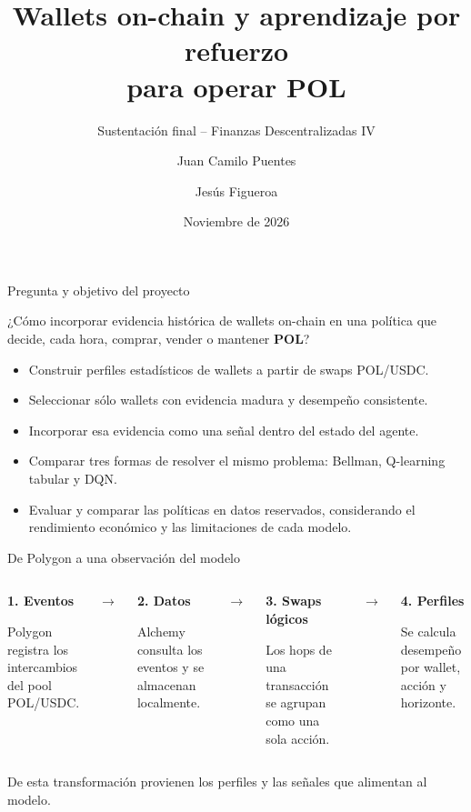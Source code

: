 \documentclass[10pt,aspectratio=169]{beamer}
\title[Wallets, Bellman, Q-learning y DQN]{Wallets on-chain y aprendizaje por refuerzo\\para operar POL}
\subtitle{Sustentación final -- Finanzas Descentralizadas IV}
\author{Juan Camilo Puentes \and Jesús Figueroa}
\institute{Profesor: Julián Sánchez}
\date{Noviembre de 2026}
\newcommand{\POL}{\textbf{POL}}
\begin{document}
\begin{frame}
  \titlepage
\end{frame}

\begin{frame}{Pregunta y objetivo del proyecto}
\begin{center}
\large ¿Cómo incorporar evidencia histórica de wallets on-chain en una política que decide, cada hora, comprar, vender o mantener \POL?
\end{center}
\vspace{.6em}
\begin{itemize}
  \item Construir perfiles estadísticos de wallets a partir de swaps POL/USDC.
  \item Seleccionar sólo wallets con evidencia madura y desempeño consistente.
  \item Incorporar esa evidencia como una señal dentro del estado del agente.
  \item Comparar tres formas de resolver el mismo problema: Bellman, Q-learning tabular y DQN.
  \item Evaluar y comparar las políticas en datos reservados, considerando el rendimiento económico y las limitaciones de cada modelo.
\end{itemize}
\end{frame}

\begin{frame}{De Polygon a una observación del modelo}
\centering
\vspace{.7em}
\begin{columns}[c,onlytextwidth]
\centering\colorbox{lightpanel}{\parbox[c][2.3cm][c]{.88\linewidth}{\centering\textbf{1. Eventos}\par\vspace{.35em}Polygon registra los intercambios del pool POL/USDC.}}
\centering\large$\rightarrow$
\centering\colorbox{lightpanel}{\parbox[c][2.3cm][c]{.88\linewidth}{\centering\textbf{2. Datos}\par\vspace{.35em}Alchemy consulta los eventos y se almacenan localmente.}}
\centering\large$\rightarrow$
\centering\colorbox{lightpanel}{\parbox[c][2.3cm][c]{.88\linewidth}{\centering\textbf{3. Swaps lógicos}\par\vspace{.35em}Los hops de una transacción se agrupan como una sola acción.}}
\centering\large$\rightarrow$
\centering\colorbox{lightpanel}{\parbox[c][2.3cm][c]{.88\linewidth}{\centering\textbf{4. Perfiles}\par\vspace{.35em}Se calcula desempeño por wallet, acción y horizonte.}}
\end{columns}
\vspace{1em}
\normalsize De esta transformación provienen los perfiles y las señales que alimentan al modelo.
\end{frame}
\end{document}
